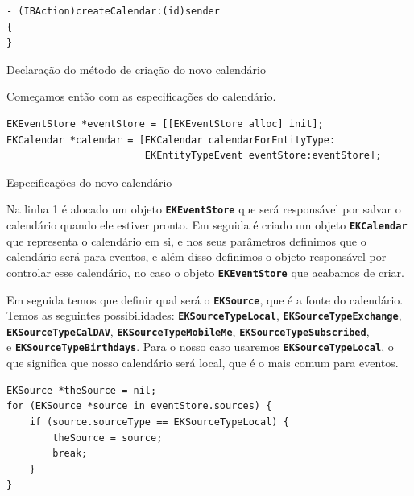 \documentclass[a4paper,12pt,brazil,doubleside]{book}
\begin{document}
\begin{singlespace}
\begin{listing}[H]
\begin{verbatim}
- (IBAction)createCalendar:(id)sender
{
}
\end{verbatim}
\caption{Declaração do método de criação do novo calendário}
\end{listing}


Começamos então com as especificações do calendário.

\begin{listing}[H]
\begin{verbatim}
EKEventStore *eventStore = [[EKEventStore alloc] init];
EKCalendar *calendar = [EKCalendar calendarForEntityType:
						EKEntityTypeEvent eventStore:eventStore];
\end{verbatim}
\caption{Especificações do novo calendário}
\end{listing}


Na linha 1 é alocado um objeto \texttt{\textbf{EKEventStore}} que será responsável por salvar o calendário quando ele estiver pronto. Em seguida é criado um objeto \texttt{\textbf{EKCalendar}} que representa o calendário em si, e nos seus parâmetros definimos que o calendário será para eventos, e além disso definimos o objeto responsável por controlar esse calendário, no caso o objeto \texttt{\textbf{EKEventStore}} que acabamos de criar.

Em seguida temos que definir qual será o \texttt{\textbf{EKSource}}, que é a fonte do calendário. Temos as seguintes possibilidades: \texttt{\textbf{EKSourceTypeLocal}}, \texttt{\textbf{EKSourceTypeExchange}},\\ \texttt{\textbf{EKSourceTypeCalDAV}}, \texttt{\textbf{EKSourceTypeMobileMe}}, \texttt{\textbf{EKSourceTypeSubscribed}},\\ e \texttt{\textbf{EKSourceTypeBirthdays}}. Para o nosso caso usaremos \texttt{\textbf{EKSourceTypeLocal}}, o que significa que nosso calendário será local, que é o mais comum para eventos.

\begin{listing}[H]
\begin{verbatim}
EKSource *theSource = nil;
for (EKSource *source in eventStore.sources) {
    if (source.sourceType == EKSourceTypeLocal) {
        theSource = source;
        break;
    }
}
    

\end{verbatim}
\end{listing}
\end{singlespace}
\end{document}
